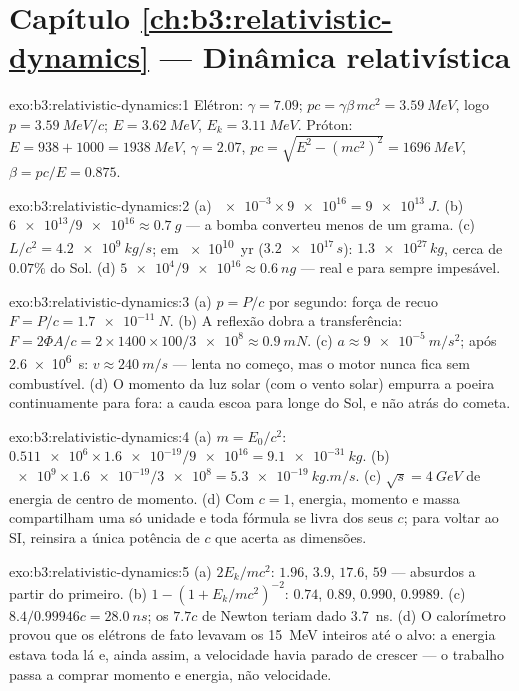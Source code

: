 \section*{Capítulo \ref{ch:b3:relativistic-dynamics} --- Dinâmica relativística}

\begin{solution}{exo:b3:relativistic-dynamics:1}
Elétron: $\gamma = 7.09$; $pc = \gamma\beta\,mc^2 = \qty{3.59}{MeV}$,
logo $p = \qty{3.59}{MeV}/c$; $E = \qty{3.62}{MeV}$, $E_k =
\qty{3.11}{MeV}$. Próton: $E = 938 + 1000 = \qty{1938}{MeV}$, $\gamma
= 2.07$, $pc = \sqrt{E^2 - (mc^2)^2} = \qty{1696}{MeV}$, $\beta =
pc/E = 0.875$.
\end{solution}

\begin{solution}{exo:b3:relativistic-dynamics:2}
(a) $\num{e-3} \times \num{9e16} = \qty{9e13}{J}$. (b) $\num{6e13}/
\num{9e16} \approx \qty{0.7}{g}$ --- a bomba converteu menos de um
grama. (c) $L/c^2 = \qty{4.2e9}{kg/s}$; em \qty{e10}{yr}
($\num{3.2e17}{}\,\unit{s}$): $\num{1.3e27}{}\,\unit{kg}$, cerca de
$0.07\%$ do Sol. (d) $\num{5e4}/\num{9e16} \approx
\qty{0.6}{ng}$ --- real e para sempre impesável.
\end{solution}

\begin{solution}{exo:b3:relativistic-dynamics:3}
(a) $p = P/c$ por segundo: força de recuo $F = P/c = \qty{1.7e-11}{N}$.
(b) A reflexão dobra a transferência: $F = 2\Phi A/c =
2 \times 1400 \times 100/\num{3e8} \approx \qty{0.9}{mN}$. (c) $a
\approx \qty{9e-5}{m/s^2}$; após \qty{2.6e6}{s}: $v \approx
\qty{240}{m/s}$ --- lenta no começo, mas o motor nunca fica sem
combustível. (d) O momento da luz solar (com o vento solar) empurra a
poeira continuamente para fora: a cauda escoa para longe do Sol, e não
atrás do cometa.
\end{solution}

\begin{solution}{exo:b3:relativistic-dynamics:4}
(a) $m = E_0/c^2$: $\num{0.511e6} \times \num{1.6e-19}/\num{9e16} =
\qty{9.1e-31}{kg}$. (b) $\num{e9} \times \num{1.6e-19}/\num{3e8} =
\qty{5.3e-19}{kg.m/s}$. (c) $\sqrt s = \qty{4}{GeV}$ de energia de
centro de momento. (d) Com $c = 1$, energia, momento e massa
compartilham uma só unidade e toda fórmula se livra dos seus $c$; para
voltar ao SI, reinsira a única potência de $c$ que acerta as dimensões.
\end{solution}

\begin{solution}{exo:b3:relativistic-dynamics:5}
(a) $2E_k/mc^2$: $1.96$, $3.9$, $17.6$, $59$ --- absurdos a partir do
primeiro. (b) $1 - (1 + E_k/mc^2)^{-2}$: $0.74$, $0.89$, $0.990$,
$0.9989$. (c) $8.4/0.99946c = \qty{28.0}{ns}$; os $7.7c$ de Newton
teriam dado \qty{3.7}{ns}. (d) O calorímetro provou que os elétrons de
fato levavam os \qty{15}{MeV} inteiros até o alvo: a energia estava
toda lá e, ainda assim, a velocidade havia parado de crescer --- o
trabalho passa a comprar momento e energia, não velocidade.
\end{solution}

